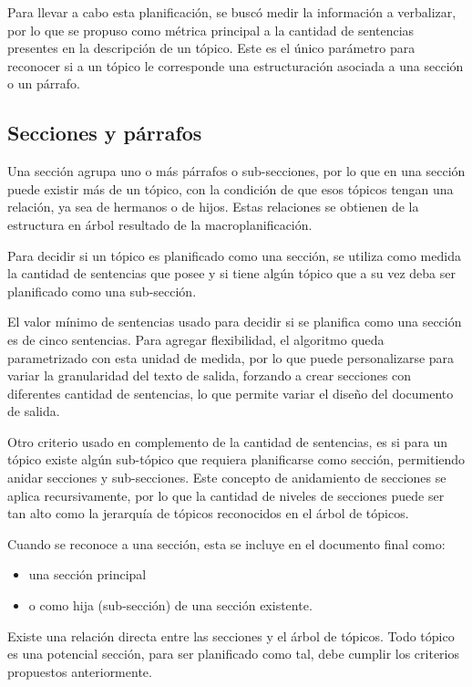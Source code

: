 Para llevar a cabo esta planificación, se buscó medir la información a verbalizar, por lo que se propuso como métrica principal a la cantidad de sentencias presentes en la descripción de un tópico. Este es el único parámetro para reconocer si a un tópico le corresponde una estructuración asociada a una sección o un párrafo. 

\subsection{Secciones y párrafos}
Una sección agrupa uno o más párrafos o sub-secciones, por lo que en una sección puede existir más de un tópico, con la condición de que esos tópicos tengan una relación, ya sea de hermanos o de hijos. Estas relaciones se obtienen de la estructura en árbol resultado de la macroplanificación. 

Para decidir si un tópico es planificado como una sección, se utiliza como medida la cantidad de sentencias que posee y si tiene algún tópico que a su vez deba ser planificado como una sub-sección.

El valor mínimo de sentencias usado para decidir si se planifica como una sección es de cinco sentencias. Para agregar flexibilidad, el algoritmo queda parametrizado con esta unidad de medida, por lo que puede personalizarse para variar la granularidad del texto de salida, forzando a crear secciones con diferentes cantidad de sentencias, lo que permite variar el diseño del documento de salida.

Otro criterio usado en complemento de la cantidad de sentencias, es si para un tópico existe algún sub-tópico que requiera planificarse como sección, permitiendo anidar secciones y sub-secciones. Este concepto de anidamiento de secciones se aplica recursivamente, por lo que la cantidad de niveles de secciones puede ser tan alto como la jerarquía de tópicos reconocidos en el árbol de tópicos. 

Cuando se reconoce a una sección, esta se incluye en el documento final como: \begin{itemize}
    \item una sección principal
    \item o como hija (sub-sección) de una sección existente.
\end{itemize}

Existe una relación directa entre las secciones y el árbol de tópicos. Todo tópico es una potencial sección, para ser planificado como tal, debe cumplir los criterios propuestos anteriormente. 

